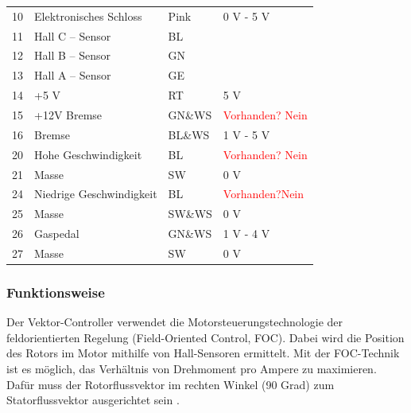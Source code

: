 \begin{table}[!ht]
\begin{tabular}{lll|l}
		\multicolumn{1}{l|}{10}      & Elektronisches Schloss   & Pink                          & 0 V - 5 V                        \\
		\multicolumn{1}{l|}{11}      & Hall C – Sensor          & BL                          &                                  \\
		\multicolumn{1}{l|}{12}      & Hall B – Sensor          & GN                          &                                  \\
		\multicolumn{1}{l|}{13}      & Hall A – Sensor          & GE                          &                                  \\
		\multicolumn{1}{l|}{14}      & +5 V                     & RT                          & 5 V                              \\
		\multicolumn{1}{l|}{15}      & +12V Bremse              & GN\&WS                      & \textcolor{red}{Vorhanden? Nein} \\
		\multicolumn{1}{l|}{16}      & Bremse                   & BL\&WS                      & 1 V - 5 V                        \\
		\multicolumn{1}{l|}{20}      & Hohe Geschwindigkeit     & BL                          & \textcolor{red}{Vorhanden? Nein} \\
		\multicolumn{1}{l|}{21}      & Masse                    & SW                          & 0 V                              \\
		\multicolumn{1}{l|}{24}      & Niedrige Geschwindigkeit & BL                          & \textcolor{red}{Vorhanden?Nein}  \\
		\multicolumn{1}{l|}{25}      & Masse                    & SW\&WS                      & 0 V                              \\
		\multicolumn{1}{l|}{26}      & Gaspedal                 & GN\&WS                      & 1 V - 4 V                        \\
		\multicolumn{1}{l|}{27}      & Masse                    & SW                          & 0 V                              \\ \hline
	\end{tabular}
\end{table}
\pagebreak[4]

\subsubsection{Funktionsweise}
\label{Vector_Controller:Funktionsweise}
Der Vektor-Controller verwendet die Motorsteuerungstechnologie der feldorientierten Regelung (Field-Oriented Control, FOC). Dabei wird die Position des Rotors im Motor mithilfe von Hall-Sensoren ermittelt. Mit der FOC-Technik ist es möglich, das Verhältnis von Drehmoment pro Ampere zu maximieren. Dafür muss der Rotorflussvektor im rechten Winkel (90 Grad) zum Statorflussvektor ausgerichtet sein \cite{Golden_Motor:Vector_Controller}.


